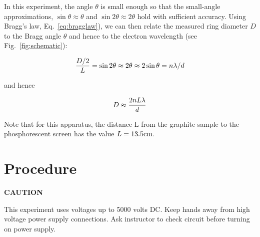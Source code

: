 \documentclass{article}
\begin{document}
In this experiment, the angle ${\theta}$ is small enough so that the
small-angle approximations, $\sin\theta \approx \theta$ and $\sin2\theta \approx 2\theta$  hold with sufficient accuracy.  Using
Bragg's law, Eq.~\ref{eq:bragglaw}), we can then relate the measured
ring diameter $D$ to the Bragg angle $\theta$ and hence to the electron
wavelength (see Fig.~\ref{fig:schematic}):

\begin{equation}
{ D/2 \over L } = \sin2\theta \approx 2\theta \approx 2\sin\theta = n\lambda/d
\end{equation}

and hence

\begin{equation}
D \approx {2nL\lambda\over d}     
\end{equation}

Note that for this apparatus, the distance L from the graphite sample to
the phosphorescent screen has the value $L = 13.5 {\rm cm} $.

\section{Procedure }

\begin{centering}
{\bf CAUTION}
\end{centering}

This experiment uses voltages up to 5000 volts DC.
Keep hands away from high voltage power supply
connections.  Ask instructor to check circuit before
turning on power supply.
\end{document}

